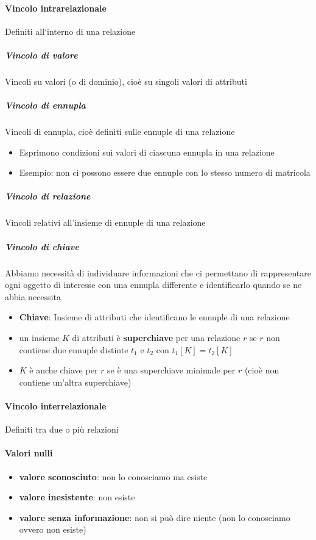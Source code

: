 \documentclass[12pt]{article}
\begin{document}
    \paragraph{Vincolo intrarelazionale}
    Definiti all‘interno di una relazione
    \subparagraph{Vincolo di valore}
    Vincoli su valori (o di dominio), cioè su singoli valori di attributi  
    \subparagraph{Vincolo di ennupla}
    Vincoli di ennupla, cioè definiti sulle ennuple di una relazione
    \begin{itemize}
        \item Esprimono condizioni sui valori di ciascuna ennupla in una relazione
        \item Esempio: non ci possono essere due ennuple con lo stesso numero di matricola   
    \end{itemize}
    \subparagraph{Vincolo di relazione}
    Vincoli relativi all'insieme di ennuple di una relazione
    \subparagraph{Vincolo di chiave}
    Abbiamo necessità di individuare informazioni che  ci permettano di rappresentare ogni oggetto di interesse con una ennupla differente e identificarlo quando se ne abbia necessita
    \begin{itemize}
        \item \textbf{Chiave}: Insieme di attributi che identificano le ennuple di una relazione
        \item un insieme $K$ di attributi è \textbf{superchiave} per una relazione $r$  se $r$  non contiene due ennuple distinte $t_1$ e $t_2$  con  $t_1[K] = t_2[K]$
        \item $K$ è anche chiave per $r$ se è una superchiave minimale per $r$ (cioè non contiene un’altra superchiave)
    \end{itemize}
    \paragraph{Vincolo interrelazionale}
    Definiti tra due o più relazioni 
    \paragraph{Valori nulli}
    \begin{itemize}
        \item \textbf{valore sconosciuto}: non lo conosciamo ma esiste
        \item \textbf{valore inesistente}: non esiste 
        \item \textbf{valore senza informazione}: non si può dire niente (non lo conosciamo ovvero non esiste)
    \end{itemize}




    
\end{document}
